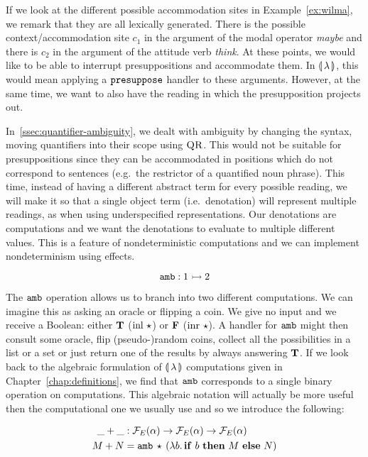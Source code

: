If we look at the different possible accommodation sites in
Example~\ref{ex:wilma}, we remark that they are all lexically
generated. There is the possible context/accommodation site $c_1$ in the
argument of the modal operator \emph{maybe} and there is $c_2$ in the
argument of the attitude verb \emph{think}. At these points, we would like
to be able to interrupt presuppositions and accommodate them. In
$\llparenthesis \, \lambda \, \rrparenthesis$, this would mean applying a $\mathtt{presuppose}$ handler to
these arguments. However, at the same time, we want to also have the
reading in which the presupposition projects
out.

In~\ref{ssec:quantifier-ambiguity}, we dealt with ambiguity by changing the
syntax, moving quantifiers into their scope using $\textsc{QR}$. This would
not be suitable for presuppositions since they can be accommodated in
positions which do not correspond to sentences (e.g.\ the restrictor of a
quantified noun phrase). This time, instead of having a different
abstract term for every possible reading, we will make it so that a single
object term (i.e.\ denotation) will represent multiple readings, as when
using underspecified representations. Our denotations are computations and
we want the denotations to evaluate to multiple different values. This is a
feature of nondeterministic computations and we can implement
nondeterminism using effects.

$$
\mathtt{amb} : 1 \rightarrowtail 2
$$

The $\mathtt{amb}$ operation allows us to branch into two different
computations. We can imagine this as asking an oracle or flipping a
coin. We give no input and we receive a Boolean: either $\textbf{T}$
($\operatorname{inl}\,\star$) or $\textbf{F}$ ($\operatorname{inr}\,\star$). A handler for
$\mathtt{amb}$ might then consult some oracle, flip (pseudo-)random coins,
collect all the possibilities in a list or a set or just return one of the
results by always answering $\textbf{T}$. If we look back to the algebraic
formulation of $\llparenthesis \, \lambda \, \rrparenthesis$ computations given in
Chapter~\ref{chap:definitions}, we find that $\mathtt{amb}$ corresponds to a
single binary operation on computations. This algebraic notation will
actually be more useful then the computational one we usually use and so we
introduce the following:

\begin{align*}
  \_+\_ &: \mathcal{F}_E(\alpha) \to \mathcal{F}_E(\alpha) \to \mathcal{F}_E(\alpha) \\
  M + N &= \mathtt{amb}\,\star\,(\lambda b.\, \text{\textbf{if} $b$ \textbf{then} $M$ \textbf{else} $N$})
\end{align*}

